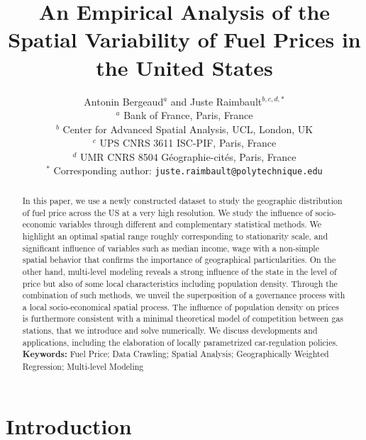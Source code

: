 \documentclass[10pt]{article}
\begin{document}
\title{An Empirical Analysis of the Spatial Variability of Fuel Prices in the United States}

\author{Antonin Bergeaud$^{a}$ and Juste Raimbault$^{b,c,d,\ast}$\medskip\\
$^{a}$ Bank of France, Paris, France\\
$^{b}$ Center for Advanced Spatial Analysis, UCL, London, UK\\
$^{c}$ UPS CNRS 3611 ISC-PIF, Paris, France\\
$^{d}$ UMR CNRS 8504 G{\'e}ographie-cit{\'e}s, Paris, France\medskip\\
$^{\ast}$ Corresponding author: \texttt{juste.raimbault@polytechnique.edu}
}

\date{}

\maketitle

\begin{abstract}
In this paper, we use a newly constructed dataset to study the geographic distribution of fuel price across the US at a very high resolution. We study the influence of socio-economic variables through different and complementary statistical methods. We highlight an optimal spatial range roughly corresponding to stationarity scale, and significant influence of variables such as median income, wage with a non-simple spatial behavior that confirms the importance of geographical particularities. On the other hand, multi-level modeling reveals a strong influence of the state in the level of price but also of some local characteristics including population density. Through the combination of such methods, we unveil the superposition of a governance process with a local socio-economical spatial process. The influence of population density on prices is furthermore consistent with a minimal theoretical model of competition between gas stations, that we introduce and solve numerically. We discuss developments and applications, including the elaboration of locally parametrized car-regulation policies.\\

\medskip\textbf{Keywords:} Fuel Price; Data Crawling; Spatial Analysis; Geographically Weighted Regression; Multi-level Modeling
\end{abstract}



\section{Introduction}
\label{main}
\end{document}
